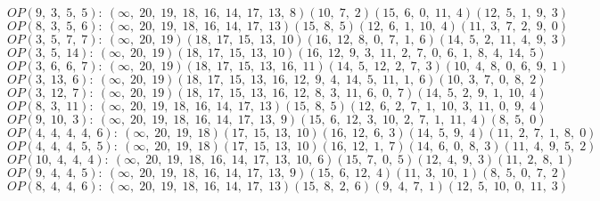$OP(9, \;3, \;5, \;5): \:(\infty, \;20, \;19, \;18, \;16, \;14, \;17, \;13, \;8)(10, \;7, \;2)(15, \;6, \;0, \;11, \;4)(12, \;5, \;1, \;9, \;3)$\\
$OP(8, \;3, \;5, \;6): \:(\infty, \;20, \;19, \;18, \;16, \;14, \;17, \;13)(15, \;8, \;5)(12, \;6, \;1, \;10, \;4)(11, \;3, \;7, \;2, \;9, \;0)$\\
$OP(3, \;5, \;7, \;7): \:(\infty, \;20, \;19)(18, \;17, \;15, \;13, \;10)(16, \;12, \;8, \;0, \;7, \;1, \;6)(14, \;5, \;2, \;11, \;4, \;9, \;3)$\\
$OP(3, \;5, \;14): \:(\infty, \;20, \;19)(18, \;17, \;15, \;13, \;10)(16, \;12, \;9, \;3, \;11, \;2, \;7, \;0, \;6, \;1, \;8, \;4, \;14, \;5)$\\
$OP(3, \;6, \;6, \;7): \:(\infty, \;20, \;19)(18, \;17, \;15, \;13, \;16, \;11)(14, \;5, \;12, \;2, \;7, \;3)(10, \;4, \;8, \;0, \;6, \;9, \;1)$\\
$OP(3, \;13, \;6): \:(\infty, \;20, \;19)(18, \;17, \;15, \;13, \;16, \;12, \;9, \;4, \;14, \;5, \;11, \;1, \;6)(10, \;3, \;7, \;0, \;8, \;2)$\\
$OP(3, \;12, \;7): \:(\infty, \;20, \;19)(18, \;17, \;15, \;13, \;16, \;12, \;8, \;3, \;11, \;6, \;0, \;7)(14, \;5, \;2, \;9, \;1, \;10, \;4)$\\
$OP(8, \;3, \;11): \:(\infty, \;20, \;19, \;18, \;16, \;14, \;17, \;13)(15, \;8, \;5)(12, \;6, \;2, \;7, \;1, \;10, \;3, \;11, \;0, \;9, \;4)$\\
$OP(9, \;10, \;3): \:(\infty, \;20, \;19, \;18, \;16, \;14, \;17, \;13, \;9)(15, \;6, \;12, \;3, \;10, \;2, \;7, \;1, \;11, \;4)(8, \;5, \;0)$\\
$OP(4, \;4, \;4, \;4, \;6): \:(\infty, \;20, \;19, \;18)(17, \;15, \;13, \;10)(16, \;12, \;6, \;3)(14, \;5, \;9, \;4)(11, \;2, \;7, \;1, \;8, \;0)$\\
$OP(4, \;4, \;4, \;5, \;5): \:(\infty, \;20, \;19, \;18)(17, \;15, \;13, \;10)(16, \;12, \;1, \;7)(14, \;6, \;0, \;8, \;3)(11, \;4, \;9, \;5, \;2)$\\
$OP(10, \;4, \;4, \;4): \:(\infty, \;20, \;19, \;18, \;16, \;14, \;17, \;13, \;10, \;6)(15, \;7, \;0, \;5)(12, \;4, \;9, \;3)(11, \;2, \;8, \;1)$\\
$OP(9, \;4, \;4, \;5): \:(\infty, \;20, \;19, \;18, \;16, \;14, \;17, \;13, \;9)(15, \;6, \;12, \;4)(11, \;3, \;10, \;1)(8, \;5, \;0, \;7, \;2)$\\
$OP(8, \;4, \;4, \;6): \:(\infty, \;20, \;19, \;18, \;16, \;14, \;17, \;13)(15, \;8, \;2, \;6)(9, \;4, \;7, \;1)(12, \;5, \;10, \;0, \;11, \;3)$\\
